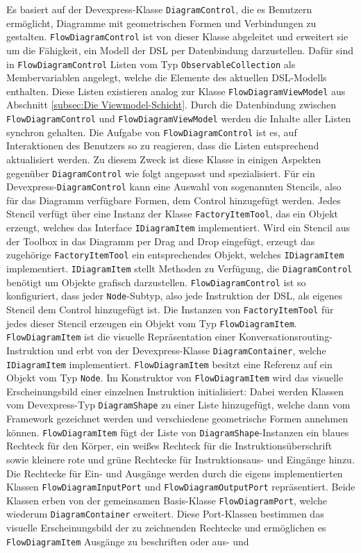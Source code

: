 \noindent Es basiert auf der Devexpress-Klasse \texttt{DiagramControl}, die es Benutzern ermöglicht, Diagramme mit geometrischen Formen und Verbindungen zu gestalten. \texttt{Flow\-Dia\-gram\-Con\-trol} ist von dieser Klasse abgeleitet und erweitert sie um die Fähigkeit, ein Modell der DSL per Datenbindung darzustellen. Dafür sind in \texttt{FlowDiagramControl} Listen vom Typ \texttt{ObservableCollection} als Membervariablen angelegt, welche die Elemente des aktuellen DSL-Modells enthalten. Diese Listen existieren analog zur Klasse \texttt{FlowDiagramViewModel} aus Abschnitt \ref{subsec:Die Viewmodel-Schicht}. Durch die Datenbindung zwischen \texttt{Flow\-Dia\-gram\-Con\-trol} und \texttt{Flow\-Dia\-gram\-View\-Mo\-del} werden die Inhalte aller Listen synchron gehalten. Die Aufgabe von \texttt{Flow\-Dia\-gram\-Con\-trol} ist es, auf Interaktionen des Benutzers so zu reagieren, dass die Listen entsprechend aktualisiert werden. Zu diesem Zweck ist diese Klasse in einigen Aspekten gegenüber \texttt{DiagramControl} wie folgt angepasst und spezialisiert. Für ein Devexpress-\texttt{DiagramControl} kann eine Auswahl von sogenannten Stencils, also für das Diagramm verfügbare Formen, dem Control hinzugefügt werden. Jedes Stencil verfügt über eine Instanz der Klasse \texttt{FactoryItemTool}, das ein Objekt erzeugt, welches das Interface \texttt{IDiagramItem} implementiert. Wird ein Stencil aus der Toolbox in das Diagramm per Drag and Drop eingefügt, erzeugt das zugehörige \texttt{FactoryItemTool} ein entsprechendes Objekt, welches \texttt{IDiagramItem} implementiert. \texttt{IDiagramItem} stellt Methoden zu Verfügung, die \texttt{DiagramControl} benötigt um Objekte grafisch darzustellen. \texttt{FlowDiagramControl} ist so konfiguriert, dass jeder \texttt{Node}-Subtyp, also jede Instruktion der DSL, als eigenes Stencil dem Control hinzugefügt ist. Die Instanzen von \texttt{FactoryItemTool} für jedes dieser Stencil erzeugen ein Objekt vom Typ \texttt{FlowDiagramItem}. \texttt{Flow\-Dia\-gram\-Item} ist die visuelle Repräsentation einer Konversationsrouting-Instruktion und erbt von der Devexpress-Klasse \texttt{DiagramContainer}, welche \texttt{IDiagramItem} implementiert. \texttt{Flow\-Dia\-gram\-Item} besitzt eine Referenz auf ein Objekt vom Typ \texttt{Node}. Im Konstruktor von \texttt{FlowDiagramItem} wird das visuelle Erscheinungsbild einer einzelnen Instruktion initialisiert: Dabei werden Klassen vom Devexpress-Typ \texttt{DiagramShape} zu einer Liste hinzugefügt, welche dann vom Framework gezeichnet werden und verschiedene geometrische Formen annehmen können. \texttt{Flow\-Dia\-gram\-Item} fügt der Liste von \texttt{DiagramShape}-Instanzen ein blaues Rechteck für den Körper, ein weißes Rechteck für die Instruktionsüberschrift sowie kleinere rote und grüne Rechtecke für Instruktionsaus- und Eingänge hinzu. Die Rechtecke für Ein- und Ausgänge werden durch die eigens implementierten Klassen \texttt{FlowDiagramInputPort} und \texttt{FlowDiagramOutputPort} repräsentiert. Beide Klassen erben von der gemeinsamen Basis-Klasse \texttt{Flow\-Dia\-gram\-Port}, welche wiederum \texttt{DiagramContainer} erweitert. Diese Port-Klassen bestimmen das visuelle Erscheinungsbild der zu zeichnenden Rechtecke und ermöglichen es \texttt{FlowDiagramItem} Ausgänge zu beschriften oder aus- und 